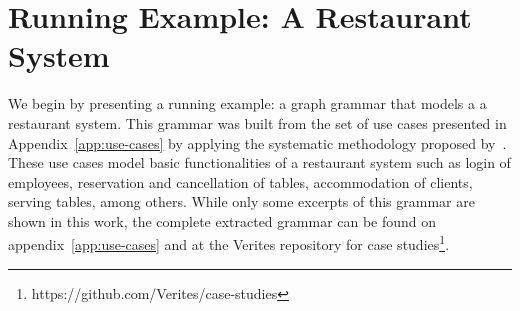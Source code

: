 \section{Running Example: A Restaurant System}

We begin by presenting a running example: a graph grammar that models a a restaurant system. This grammar was built from the set of use cases presented in Appendix~\ref{app:use-cases} by applying the systematic methodology proposed by~\cite{Junior2015}. These use cases model basic functionalities of a restaurant system such as login of employees, reservation and cancellation of tables, accommodation of clients, serving tables, among others. While only some excerpts of this grammar are shown in this work, the complete extracted grammar can be found on appendix~\ref{app:use-cases} and at the Verites repository for case studies\footnote{https://github.com/Verites/case-studies}.

